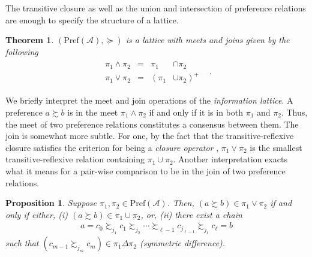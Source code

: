 \documentclass[conference]{ieeeconf}
\newcommand{\powerset}[1]{2^{#1}}
\newcommand{\A}{\mathcal{A}}
\newcommand{\X}{\mathcal{X}}
\newcommand{\Pref}{\mathrm{Pref}}
\newcommand{\prefers}{\succsim}
\newcommand{\join}{\vee}
\newcommand{\meet}{\wedge}
\DeclareMathOperator{\cl}{cl}
\DeclareMathOperator{\Cl}{Cl}
\newtheorem{theorem}{Theorem}
\newtheorem{proposition}{Proposition}
\begin{document}

The transitive closure as well as the union and intersection of preference relations are enough to specify the structure of a lattice.

\begin{theorem}
    $(\Pref(\A), \succeq)$ is a lattice with meets and joins given by the following
    \leavevmode
    \begin{align}
    \begin{aligned}
        \pi_1 \meet \pi_2 &=& \pi_1 &\cap \pi_2& \\
 \pi_1 \join \pi_2 &=&  \left(\pi_1  \right. &\left. \cup \pi_2  \right)^{+}
    \end{aligned}. \label{eq:join-meets}
\end{align}
\end{theorem}

We briefly interpret the meet and join operations of the \emph{information lattice}. A preference $a \prefers b$ is in the meet $\pi_1 \meet \pi_2$ if and only if it is in both $\pi_1$ and $\pi_2$. Thus, the meet of two preference relations constitutes a consensus between them. The join is somewhat more subtle. For one, by the fact that the transitive-reflexive closure satisfies the criterion for being a \emph{closure operator} \cite{roman}, $\pi_1 \join \pi_2$ is the smallest transitive-reflexive relation containing $\pi_1 \cup \pi_2$. Another interpretation exacts what it means for a pair-wise comparison to be in the join of two preference relations.
\begin{proposition}
    Suppose $\pi_1, \pi_2 \in \Pref(\A)$. Then, $(a \prefers b) \in \pi_1 \join \pi_2$ if and only if either, (i) $(a \prefers b) \in \pi_1 \cup \pi_2$, or, (ii) there exist a chain
    \begin{align}
        a = c_0 \prefers_{j_1} c_1 \prefers_{j_2}  \cdots \prefers_{\ell-1} c_{j_{\ell-1}} \prefers_{j_\ell} c_{\ell} = b \label{eq:chain}
    \end{align}
    such that $\left( c_{m-1} \prefers_{{j_m}} c_{m} \right) \in \pi_1 \Delta \pi_2$ (symmetric difference).
\end{proposition}
\end{document}
